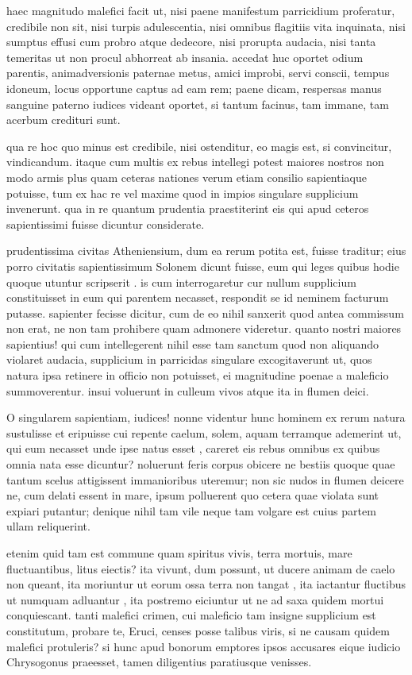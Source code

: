  haec magnitudo malefici facit ut, nisi paene manifestum parricidium proferatur, credibile non sit, nisi turpis adulescentia, nisi omnibus flagitiis vita inquinata, nisi sumptus effusi cum probro atque dedecore, nisi prorupta audacia, nisi tanta temeritas ut non procul abhorreat ab insania. accedat huc oportet odium parentis, animadversionis paternae metus, amici improbi, servi conscii, tempus idoneum, locus opportune captus ad eam rem; paene dicam, respersas manus sanguine paterno iudices videant oportet, si tantum facinus, tam immane, tam acerbum credituri sunt.

 qua re hoc quo minus est credibile, nisi ostenditur, eo magis est, si convincitur, vindicandum. itaque cum multis ex rebus intellegi potest maiores nostros non modo armis plus quam ceteras nationes verum etiam consilio sapientiaque potuisse, tum ex hac re vel maxime quod in impios singulare supplicium invenerunt. qua in re quantum prudentia praestiterint eis qui apud ceteros sapientissimi fuisse dicuntur considerate.

 prudentissima civitas Atheniensium, dum ea rerum potita est, fuisse traditur; eius porro civitatis sapientissimum Solonem dicunt fuisse, eum qui leges quibus hodie quoque utuntur scripserit . is cum interrogaretur cur nullum supplicium constituisset in eum qui parentem necasset, respondit se id neminem facturum putasse. sapienter fecisse dicitur, cum de eo nihil sanxerit quod antea commissum non erat, ne non tam prohibere quam admonere videretur. quanto nostri maiores sapientius! qui cum intellegerent nihil esse tam sanctum quod non aliquando violaret audacia, supplicium in parricidas singulare excogitaverunt ut, quos natura ipsa retinere in officio non potuisset, ei magnitudine poenae a maleficio summoverentur. insui voluerunt in culleum vivos atque ita in flumen deici.

 O singularem sapientiam, iudices! nonne videntur hunc hominem ex rerum natura sustulisse et eripuisse cui repente caelum, solem, aquam terramque ademerint ut, qui eum necasset unde ipse natus esset , careret eis rebus omnibus ex quibus omnia nata esse dicuntur? noluerunt feris corpus obicere ne bestiis quoque quae tantum scelus attigissent immanioribus uteremur; non sic nudos in flumen deicere ne, cum delati essent in mare, ipsum polluerent quo cetera quae violata sunt expiari putantur; denique nihil tam vile neque tam volgare est cuius partem ullam reliquerint.

 etenim quid tam est commune quam spiritus vivis, terra mortuis, mare fluctuantibus, litus eiectis? ita vivunt, dum possunt, ut ducere animam de caelo non queant, ita moriuntur ut eorum ossa terra non tangat , ita iactantur fluctibus ut numquam adluantur , ita postremo eiciuntur ut ne ad saxa quidem mortui conquiescant. tanti malefici crimen, cui maleficio tam insigne supplicium est constitutum, probare te, Eruci, censes posse talibus viris, si ne causam quidem malefici protuleris? si hunc apud bonorum emptores ipsos accusares eique iudicio Chrysogonus praeesset, tamen diligentius paratiusque venisses.


